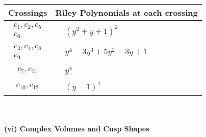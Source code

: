 \documentclass[1p]{elsarticle_modified}
\theoremstyle{definition}
\begin{document}
\begin{tabular}{m{50pt}|m{274pt}}
Crossings & \hspace{64pt}Riley Polynomials at each crossing \\
\hline $$\begin{aligned}c_{1},c_{2},c_{5}\\c_{6}\end{aligned}$$&$\begin{aligned}
&(y^2+y+1)^2
\end{aligned}$\\
\hline $$\begin{aligned}c_{3},c_{4},c_{8}\\c_{9}\end{aligned}$$&$\begin{aligned}
&y^4-3 y^3+5 y^2-3 y+1
\end{aligned}$\\
\hline $$\begin{aligned}c_{7},c_{11}\end{aligned}$$&$\begin{aligned}
&y^4
\end{aligned}$\\
\hline $$\begin{aligned}c_{10},c_{12}\end{aligned}$$&$\begin{aligned}
&(y-1)^4
\end{aligned}$\\
\hline
\end{tabular}\\~\\
\newpage\flushleft \textbf{(vi) Complex Volumes and Cusp Shapes}
\end{document}
